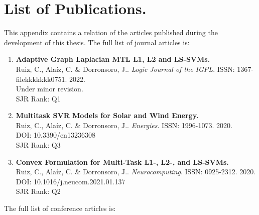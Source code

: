 


\chapter{List of Publications.}
\label{AppendixA}

This appendix contains a relation of the articles published during the development of this thesis.
%
The full list of journal articles is:
\begin{enumerate}
    \item \textbf{Adaptive Graph Laplacian MTL L1, L2 and
    LS-SVMs.}\\
    {Ruiz, C.}, Alaíz, C. \& Dorronsoro, J.. 
    \emph{Logic Journal of the IGPL}. ISSN: 1367-filekkkkkkk0751. 2022.\\
    Under minor revision.\\
    SJR Rank: Q1 
    \item \textbf{Multitask SVR Models for Solar and Wind Energy.}\\
    {Ruiz, C.}, Alaíz, C. \& Dorronsoro, J.. 
    \emph{Energies}. ISSN: 1996-1073. 2020.\\
    DOI: 10.3390/en13236308\\
    SJR Rank: Q3
    \item \textbf{Convex Formulation for Multi-Task L1-, L2-, and LS-SVMs.}\\
    {Ruiz, C.}, Alaíz, C. \& Dorronsoro, J.. 
    \emph{Neurocomputing}. ISSN: 0925-2312. 2020.\\
    DOI: 10.1016/j.neucom.2021.01.137\\
    SJR Rank: Q2
\end{enumerate}
%
The full list of conference articles is:
